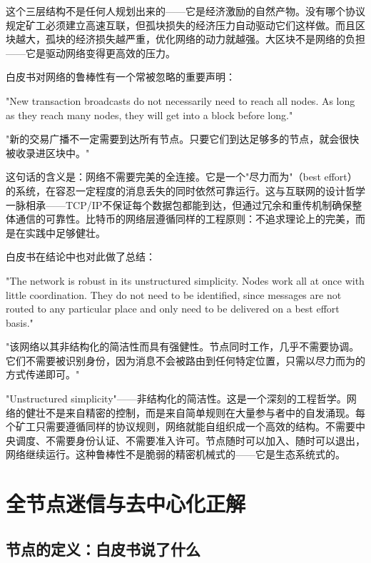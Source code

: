 \documentclass[a4paper,12pt,openany]{ctexbook}
\newenvironment{quoting}{%
  \par\vspace{0.5em}%
  \begin{list}{}{%
    \setlength{\leftmargin}{2em}%
    \setlength{\rightmargin}{2em}%
    \setlength{\parsep}{0.3em}%
    \setlength{\itemsep}{0pt}%
    \setlength{\topsep}{0pt}%
  }%
  \item\relax
}{%
  \end{list}%
  \par\vspace{0.5em}%
}
\begin{document}
这个三层结构不是任何人规划出来的——它是经济激励的自然产物。没有哪个协议规定矿工必须建立高速互联，但孤块损失的经济压力自动驱动它们这样做。而且区块越大，孤块的经济损失越严重，优化网络的动力就越强。大区块不是网络的负担——它是驱动网络变得更高效的压力。

白皮书对网络的鲁棒性有一个常被忽略的重要声明：


\begin{quoting}
\small
"New transaction broadcasts do not necessarily need to reach all nodes. As long as they reach many nodes, they will get into a block before long."

"新的交易广播不一定需要到达所有节点。只要它们到达足够多的节点，就会很快被收录进区块中。"
\end{quoting}


这句话的含义是：网络不需要完美的全连接。它是一个"尽力而为"（best effort）的系统，在容忍一定程度的消息丢失的同时依然可靠运行。这与互联网的设计哲学一脉相承——TCP/IP不保证每个数据包都能到达，但通过冗余和重传机制确保整体通信的可靠性。比特币的网络层遵循同样的工程原则：不追求理论上的完美，而是在实践中足够健壮。

白皮书在结论中也对此做了总结：


\begin{quoting}
\small
"The network is robust in its unstructured simplicity. Nodes work all at once with little coordination. They do not need to be identified, since messages are not routed to any particular place and only need to be delivered on a best effort basis."

"该网络以其非结构化的简洁性而具有强健性。节点同时工作，几乎不需要协调。它们不需要被识别身份，因为消息不会被路由到任何特定位置，只需以尽力而为的方式传递即可。"
\end{quoting}


"Unstructured simplicity"——非结构化的简洁性。这是一个深刻的工程哲学。网络的健壮不是来自精密的控制，而是来自简单规则在大量参与者中的自发涌现。每个矿工只需要遵循同样的协议规则，网络就能自组织成一个高效的结构。不需要中央调度、不需要身份认证、不需要准入许可。节点随时可以加入、随时可以退出，网络继续运行。这种鲁棒性不是脆弱的精密机械式的——它是生态系统式的。


\section*{全节点迷信与去中心化正解}



\subsection*{节点的定义：白皮书说了什么}
\end{document}
